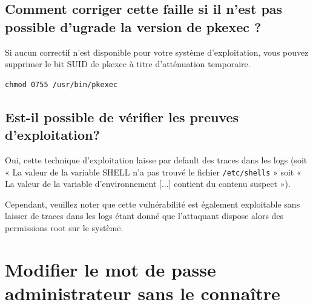 \documentclass[12pt,a4paper]{article}
\newcommand{\code}[1]{\colorbox{light-gray}{\texttt{#1}}}
\begin{document}
            \subsection{Comment corriger cette faille si il n'est pas possible d'ugrade la version de pkexec ?}
            \begin{flushleft}
                \noindent Si aucun correctif n’est disponible pour votre système d’exploitation, vous pouvez supprimer le bit SUID de pkexec à titre d’atténuation temporaire.
                \begin{lstlisting}
chmod 0755 /usr/bin/pkexec
                \end{lstlisting}
            \end{flushleft}
            \subsection{Est-il possible de vérifier les preuves d’exploitation?}
            \begin{flushleft}
                \noindent Oui, cette technique d’exploitation laisse par default des traces dans les logs (soit « La valeur de la variable SHELL n’a pas trouvé le fichier \code{/etc/shells} » soit « La valeur de la variable d’environnement [...] contient du contenu suspect »). 
                \item Cependant, veuillez noter que cette vulnérabilité est également exploitable sans laisser de traces dans les logs étant donné que l'attaquant dispose alors des permissions root sur le système.
            \end{flushleft}
    \newpage
   \section{Modifier le mot de passe administrateur sans le connaître}
\end{document}
